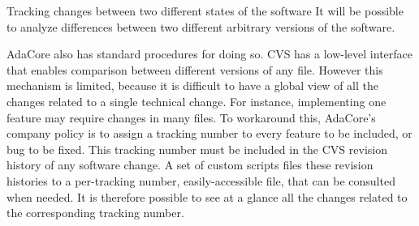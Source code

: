 \begin{requirement}{Tracking changes between two different states of
  the software}
  It will be possible to analyze differences between two different
  arbitrary versions of the software.
\end{requirement}

\begin{rationale}
  AdaCore also has standard procedures for doing so. CVS has a
  low-level interface that enables comparison between different
  versions of any file.
  However this mechanism is limited, because it is difficult to have a
  global view of all the changes related to a single technical
  change. For instance, implementing one feature may require changes
  in many files.
  To workaround this, AdaCore's company policy is to assign a tracking
  number to every feature to be included, or bug to be fixed. This
  tracking number must be included in the CVS revision history of any
  software change. A set of custom scripts files these revision
  histories to a per-tracking number, easily-accessible file, that can
  be consulted when needed. It is therefore possible to see at a
  glance all the changes related to the corresponding tracking number.
\end{rationale}

